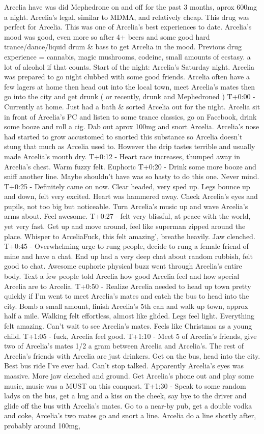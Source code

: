 \documentclass[12pt]{book}
\begin{document}
Arcelia have was did Mephedrone on and off for the past 3 months, aprox 600mg a night. Arcelia's legal, similar to MDMA, and relatively cheap. This drug was perfect for Arcelia. This was one of Arcelia's best experiences to date. Arcelia's mood was good, even more so after 4+ beers and some good hard trance/dance/liquid drum \& bass to get Arcelia in the mood. Previous drug experience = cannabis, magic mushrooms, codeine, small amounts of ecstasy. a lot of alcohol if that counts. Start of the night: Arcelia's Saturday night. Arcelia was prepared to go night clubbed with some good friends. Arcelia often have a few lagers at home then head out into the local town, meet Arcelia's mates then go into the city and get drunk ( or recently, drunk and Mephedroned ) T+0:00 - Currently at home. Just had a bath \& sorted Arcelia out for the night. Arcelia sit in front of Arcelia's PC and listen to some trance classics, go on Facebook, drink some booze and roll a cig. Dab out aprox 100mg and snort Arcelia. Arcelia's nose had started to grow accustomed to snorted this substance so Arcelia doesn't stung that much as Arcelia used to. However the drip tastes terrible and usually made Arcelia's mouth dry. T+0:12 - Heart race increases, thumped away in Arcelia's chest. Warm fuzzy felt. Euphoric T+0:20 - Drink some more booze and sniff another line. Maybe shouldn't have was so hasty to do this one. Never mind. T+0:25 - Definitely came on now. Clear headed, very sped up. Legs bounce up and down, felt very excited. Heart was hammered away. Check Arcelia's eyes and pupils, not too big but noticeable. Turn Arcelia's music up and wave Arcelia's arms about. Feel awesome. T+0:27 - felt very blissful, at peace with the world, yet very fast. Get up and move around, feel like superman zipped around the place. Whisper to ArceliaFuck, this felt amazing', breathe heavily. Jaw clenched. T+0:45 - Overwhelming urge to rung people, decide to rung a female friend of mine and have a chat. End up had a very deep chat about random rubbish, felt good to chat. Awesome euphoric physical buzz went through Arcelia's entire body. Text a few people told Arcelia how good Arcelia feel and how special Arcelia are to Arcelia. T+0:50 - Realize Arcelia needed to head up town pretty quickly if I'm went to meet Arcelia's mates and catch the bus to head into the city. Bomb a small amount, finish Arcelia's 5th can and walk up town, approx half a mile. Walking felt effortless, almost like glided. Legs feel light. Everything felt amazing. Can't wait to see Arcelia's mates. Feels like Christmas as a young child. T+1:05 - fuck, Arcelia feel good. T+1:10 - Meet 5 of Arcelia's friends, give two of Arcelia's mates 1/2 a gram between Arcelia and Arcelia's. The rest of Arcelia's friends with Arcelia are just drinkers. Get on the bus, head into the city. Best bus ride I've ever had. Can't stop talked. Apparently Arcelia's eyes was massive. More jaw clenched and ground. Get Arcelia's phone out and play some music, music was a MUST on this conquest. T+1:30 - Speak to some random ladys on the bus, get a hug and a kiss on the cheek, say bye to the driver and glide off the bus with Arcelia's mates. Go to a near-by pub, get a double vodka and coke, Arcelia's two mates go and snort a line. Arcelia do a line shortly after, probably around 100mg, 
\end{document}

